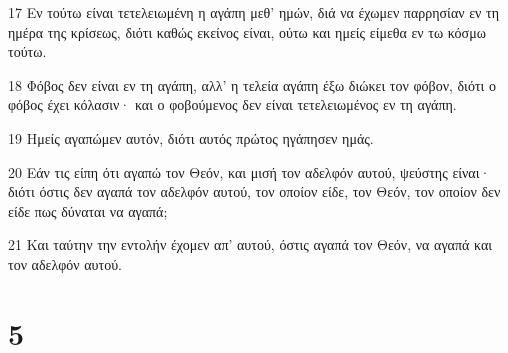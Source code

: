 \par 17 Εν τούτω είναι τετελειωμένη η αγάπη μεθ' ημών, διά να έχωμεν παρρησίαν εν τη ημέρα της κρίσεως, διότι καθώς εκείνος είναι, ούτω και ημείς είμεθα εν τω κόσμω τούτω.
\par 18 Φόβος δεν είναι εν τη αγάπη, αλλ' η τελεία αγάπη έξω διώκει τον φόβον, διότι ο φόβος έχει κόλασιν· και ο φοβούμενος δεν είναι τετελειωμένος εν τη αγάπη.
\par 19 Ημείς αγαπώμεν αυτόν, διότι αυτός πρώτος ηγάπησεν ημάς.
\par 20 Εάν τις είπη ότι αγαπώ τον Θεόν, και μισή τον αδελφόν αυτού, ψεύστης είναι· διότι όστις δεν αγαπά τον αδελφόν αυτού, τον οποίον είδε, τον Θεόν, τον οποίον δεν είδε πως δύναται να αγαπά;
\par 21 Και ταύτην την εντολήν έχομεν απ' αυτού, όστις αγαπά τον Θεόν, να αγαπά και τον αδελφόν αυτού.

\chapter{5}

